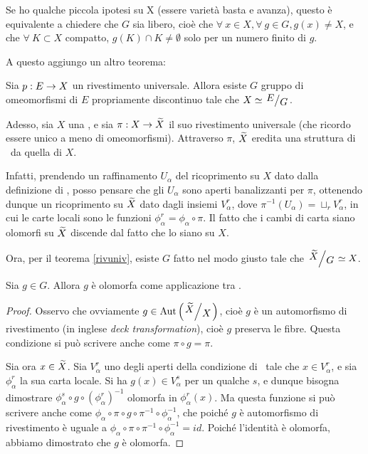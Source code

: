 Se ho qualche piccola ipotesi su X (essere varietà basta e avanza), questo è equivalente a chiedere che $G$ sia libero, cioè che $\forall\ x \in X, \forall\ g\in G, g(x)\neq X$, e che $\forall\ K \subset X$ compatto, $g(K)\cap K \neq \emptyset$ solo per un numero finito di $g$.

A questo aggiungo un altro teorema:

\begin{teorema} \label{rivuniv}
 	Sia $p:E\rightarrow X$ un rivestimento universale. Allora esiste $G$ gruppo di omeomorfismi di $E$ propriamente discontinuo tale che $X\isom\quotient{E}{G}$.
\end{teorema}

Adesso, sia $X$ una \sdR, e sia $\pi:X\rightarrow\widetilde{X}$ il suo rivestimento universale (che ricordo essere unico a meno di omeomorfismi). Attraverso $\pi$, $\widetilde{X}$ eredita una struttura di \sdR\ da quella di $X$.

Infatti, prendendo un raffinamento $U_\alpha$ del ricoprimento su $X$ dato dalla definizione di \sdR, posso pensare che gli $U_\alpha$ sono aperti banalizzanti per $\pi$, ottenendo dunque un ricoprimento su $\widetilde{X}$ dato dagli insiemi $V_\alpha^r$, dove $\pi^{-1}(U_\alpha)=\sqcup_r V_\alpha^r$, in cui le carte locali sono le funzioni $\phi_\alpha^r=\phi_\alpha\circ\pi$. Il fatto che i cambi di carta siano olomorfi su $\widetilde{X}$ discende dal fatto che lo siano su $X$.

Ora, per il teorema \ref{rivuniv}, esiste $G$ fatto nel modo giusto tale che $\quotient{\ot X}{G}\isom X$.
\begin{lemma}
 	Sia $g\in G$. Allora $g$ è olomorfa come applicazione tra \sdR.
\end{lemma}
\begin{proof}
 	Osservo che ovviamente $g \in \mbox{Aut}\left(\quotient{\ot X}{X}\right)$, cioè $g$ è un automorfismo di rivestimento (in inglese \emph{deck transformation}), cioè $g$ preserva le fibre. Questa condizione si può scrivere anche come $\pi\circ g=\pi$.

 	Sia ora $x\in \widetilde{X}$. Sia $V_\alpha^r$ uno degli aperti della condizione di \sdR\ tale che $x\in V_\alpha^r$, e sia $\phi_\alpha^r$ la sua carta locale. Si ha $g(x)\in V_\alpha^s$ per un qualche $s$, e dunque bisogna dimostrare $\phi_\alpha^s\circ g\circ (\phi_\alpha^r)^{-1}$ olomorfa in $\phi_\alpha^r(x)$. Ma questa funzione si può scrivere anche come $\phi_\alpha\circ\pi\circ g\circ \pi^{-1}\circ \phi_\alpha^{-1}$, che poiché $g$ è automorfismo di rivestimento è uguale a $\phi_\alpha\circ\pi\circ\pi^{-1}\circ\phi_\alpha^{-1}=id$. Poiché l'identità è olomorfa, abbiamo dimostrato che $g$ è olomorfa.
\end{proof}

